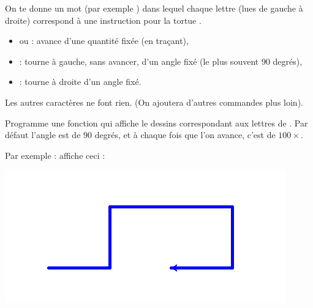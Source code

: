 \documentclass[11pt,class=report,crop=false]{standalone}
\begin{document}

\begin{activite}


On te donne un mot (par exemple ) dans lequel chaque lettre (lues de gauche à droite) correspond à une instruction pour la tortue \Python{}.

\begin{itemize}
  \item {} ou  : avance d'une quantité fixée (en traçant),
  \item {} : tourne à gauche, sans avancer, d'un angle fixé (le plus souvent $90$ degrés),
  \item {} : tourne à droite d'un angle fixé.
\end{itemize}

Les autres caractères ne font rien. (On ajoutera d'autres commandes plus loin).

Programme une fonction 
qui affiche le dessins correspondant aux lettres de . Par défaut l'angle est de $90$ degrés, et à chaque fois que l'on avance, c'est de $100 \times$.

Par exemple :  affiche ceci :
\begin{center}
\includegraphics[scale=0.6]{ecran-lsysteme-1}
\end{center}

\end{activite}


\end{document}
